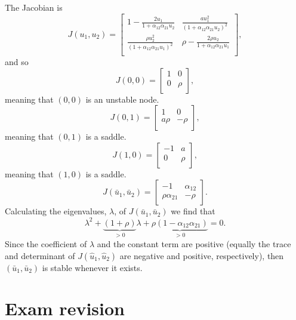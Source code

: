 \documentclass[]{article}
\newcommand{\bb}{\begin{equation}}
\newcommand{\ee}{\end{equation}}
\renewcommand{\l}{\left(}
\renewcommand{\r}{\right)}
\begin{document}
\begin{Answ}
\subsubsection{}
The Jacobian is
\bb
J(u_1,u_2)=\left[ {\begin{array}{cc}
   1-\frac{2u_1}{1+\alpha_{12}\alpha_{21}u_2} & \frac{a u_1^2}{\l 1+\alpha_{12}\alpha_{21}u_2\r^2} \\
   \frac{\rho u_2^2}{\l 1+\alpha_{12}\alpha_{21}u_1\r^2} & \rho -\frac{2\rho u_2}{1+\alpha_{12}\alpha_{21}u_1} \\
  \end{array} } \right],
\ee
and so
\bb
J(0,0)=\left[ {\begin{array}{cc}
   1 & 0 \\
   0 & \rho \\
  \end{array} } \right],
\ee
meaning that $(0,0)$ is an unstable node.
\bb
J(0,1)=\left[ {\begin{array}{cc}
   1 & 0 \\
   a\rho & -\rho \\
  \end{array} } \right],
\ee
meaning that $(0,1)$ is a saddle.
\bb
J(1,0)=\left[ {\begin{array}{cc}
   -1 & a \\
   0 & \rho \\
  \end{array} } \right],
\ee
meaning that $(1,0)$ is a saddle.
\bb
J(\bar{u}_1,\bar{u}_2)=\left[ {\begin{array}{cc}
   -1 & \alpha_{12} \\
   \rho\alpha_{21} & -\rho \\
  \end{array} } \right].
\ee
Calculating the eigenvalues, $\lambda$, of $J(\bar{u}_1,\bar{u}_2)$ we find that
\bb
\lambda^2 +\underbrace{(1+\rho)}_{>0}\lambda+\underbrace{\rho(1-\alpha_{12}\alpha_{21})}_{>0}=0.
\ee
Since the coefficient of $\lambda$ and the constant term are positive (equally the trace and determinant of $J(\hat{u}_1,\hat{u}_2)$ are negative and positive, respectively), then $(\bar{u}_1,\bar{u}_2)$ is stable whenever it exists.
\end{Answ}

\section*{Exam revision}
\end{document}
